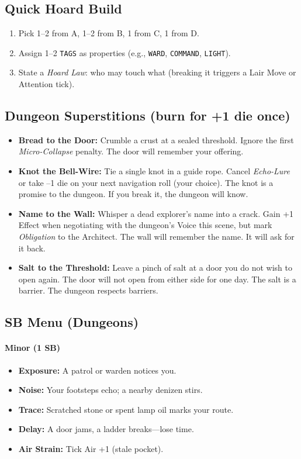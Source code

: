 \subsection*{Quick Hoard Build}
\begin{enumerate}
    \item Pick 1--2 from A, 1--2 from B, 1 from C, 1 from D.
    \item Assign 1--2 \texttt{TAGS} as properties (e.g., \texttt{WARD}, \texttt{COMMAND}, \texttt{LIGHT}).
    \item State a \emph{Hoard Law}: who may touch what (breaking it triggers a Lair Move or Attention tick).
\end{enumerate}

\subsection*{Dungeon Superstitions (burn for +1 die once)}
\begin{itemize}
    \item \textbf{Bread to the Door:} Crumble a crust at a sealed threshold. Ignore the first \emph{Micro-Collapse} penalty. The door will remember your offering.
    \item \textbf{Knot the Bell-Wire:} Tie a single knot in a guide rope. Cancel \emph{Echo-Lure} or take --1 die on your next navigation roll (your choice). The knot is a promise to the dungeon. If you break it, the dungeon will know.
    \item \textbf{Name to the Wall:} Whisper a dead explorer's name into a crack. Gain +1 Effect when negotiating with the dungeon's Voice this scene, but mark \emph{Obligation} to the Architect. The wall will remember the name. It will ask for it back.
    \item \textbf{Salt to the Threshold:} Leave a pinch of salt at a door you do not wish to open again. The door will not open from either side for one day. The salt is a barrier. The dungeon respects barriers.
\end{itemize}

\subsection*{SB Menu (Dungeons)}
\paragraph{Minor (1 SB)}
\begin{itemize}
    \item \textbf{Exposure:} A patrol or warden notices you.
    \item \textbf{Noise:} Your footsteps echo; a nearby denizen stirs.
    \item \textbf{Trace:} Scratched stone or spent lamp oil marks your route.
    \item \textbf{Delay:} A door jams, a ladder breaks---lose time.
    \item \textbf{Air Strain:} Tick Air +1 (stale pocket).
\end{itemize}

